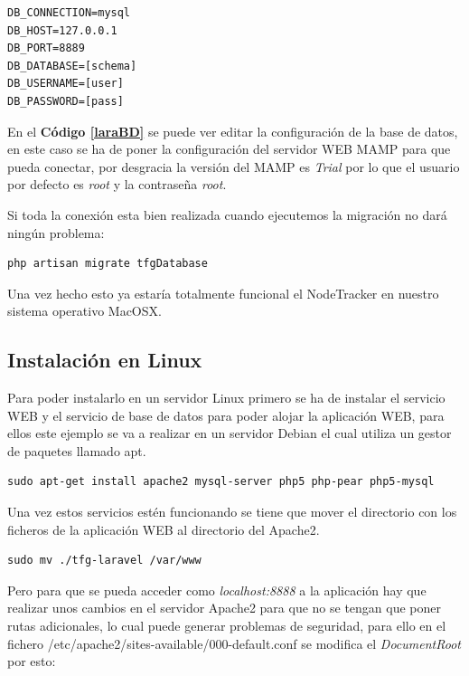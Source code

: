 \begin{lstlisting}[caption=Configuracion de la BD en Laravel, label=laraBD]
DB_CONNECTION=mysql
DB_HOST=127.0.0.1
DB_PORT=8889
DB_DATABASE=[schema]
DB_USERNAME=[user]
DB_PASSWORD=[pass]
\end{lstlisting}

En el \textbf{Código \ref{laraBD}} se puede ver editar la configuración de la base de datos, en este caso se ha de poner la configuración del servidor WEB MAMP para que pueda conectar, por desgracia la versión del MAMP es \textit{Trial} por lo que el usuario por defecto es \textit{root} y la contraseña \textit{root}.

Si toda la conexión esta bien realizada cuando ejecutemos la migración no dará ningún problema:

\begin{lstlisting}[caption=Migracion, label=phpmigrate]
	php artisan migrate tfgDatabase
\end{lstlisting}

Una vez hecho esto ya estaría totalmente funcional el NodeTracker en nuestro sistema operativo MacOSX.

\subsection{Instalación en Linux}

Para poder instalarlo en un servidor Linux primero se ha de instalar el servicio WEB y el servicio de base de datos para poder alojar la aplicación WEB, para ellos este ejemplo se va a realizar en un servidor Debian el cual utiliza un gestor de paquetes llamado apt.

\begin{lstlisting}[caption=Instalación del Servicio Apache en Linux, label=apachelinux]
sudo apt-get install apache2 mysql-server php5 php-pear php5-mysql
\end{lstlisting}

Una vez estos servicios estén funcionando se tiene que mover el directorio con los ficheros de la aplicación WEB al directorio del Apache2.

\begin{lstlisting}[caption=Instalación del Servicio Apache en Linux, label=apachelinux]
sudo mv ./tfg-laravel /var/www
\end{lstlisting}

Pero para que se pueda acceder como \textit{localhost:8888} a la aplicación hay que realizar unos cambios en el servidor Apache2 para que no se tengan que poner rutas adicionales, lo cual puede generar problemas de seguridad, para ello en el fichero /etc/apache2/sites-available/000-default.conf se modifica el \textit{DocumentRoot} por esto:

